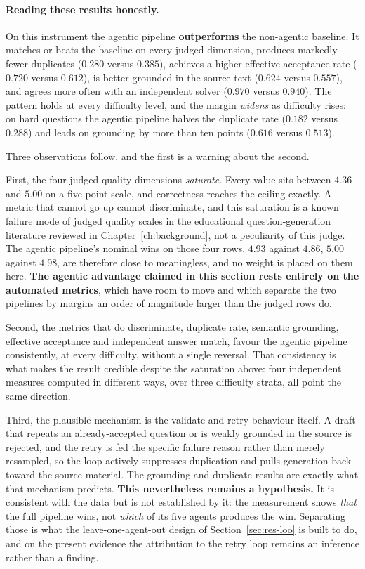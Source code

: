 \paragraph{Reading these results honestly.}
\label{sec:res-discuss}
On this instrument the agentic pipeline \textbf{outperforms} the non-agentic
baseline. It matches or beats the baseline on every judged dimension, produces
markedly fewer duplicates ($0.280$ versus $0.385$), achieves a higher effective
acceptance rate ($0.720$ versus $0.612$), is better grounded in the source text
($0.624$ versus $0.557$), and agrees more often with an independent solver
($0.970$ versus $0.940$). The pattern holds at every difficulty level, and the
margin \emph{widens} as difficulty rises: on hard questions the agentic pipeline
halves the duplicate rate ($0.182$ versus $0.288$) and leads on grounding by
more than ten points ($0.616$ versus $0.513$).

Three observations follow, and the first is a warning about the second.

First, the four judged quality dimensions \emph{saturate}. Every value sits
between $4.36$ and $5.00$ on a five-point scale, and correctness reaches the
ceiling exactly. A metric that cannot go up cannot discriminate, and this
saturation is a known failure mode of judged quality scales in the educational
question-generation literature reviewed in Chapter~\ref{ch:background}, not a
peculiarity of this judge. The agentic pipeline's nominal wins on those
four rows, $4.93$ against $4.86$, $5.00$ against $4.98$, are therefore close
to meaningless, and no weight is placed on them here. \textbf{The agentic
advantage claimed in this section rests entirely on the automated metrics},
which have room to move and which separate the two pipelines by margins an
order of magnitude larger than the judged rows do.

Second, the metrics that do discriminate, duplicate rate, semantic grounding,
effective acceptance and independent answer match, favour the agentic pipeline
consistently, at every difficulty, without a single reversal. That consistency
is what makes the result credible despite the saturation above: four
independent measures computed in different ways, over three difficulty strata,
all point the same direction.

Third, the plausible mechanism is the validate-and-retry behaviour itself. A
draft that repeats an already-accepted question or is weakly grounded in the
source is rejected, and the retry is fed the specific failure reason rather than
merely resampled, so the loop actively suppresses duplication and pulls
generation back toward the source material. The grounding and duplicate results
are exactly what that mechanism predicts. \textbf{This nevertheless remains a
hypothesis.} It is consistent with the data but is not established by it: the
measurement shows \emph{that} the full pipeline wins, not \emph{which} of its
five agents produces the win. Separating those is what the leave-one-agent-out design of
Section~\ref{sec:res-loo} is built to do, and on the present evidence the
attribution to the retry loop remains an inference rather than a finding.

